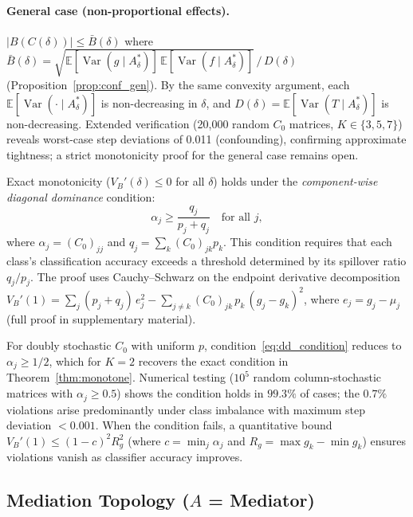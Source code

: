 \paragraph{General case (non-proportional effects).}
$|B(C(\delta))|\leq\bar{B}(\delta)$ where $\bar{B}(\delta)=\sqrt{\mathbb{E}[\operatorname{Var}(g\mid A^*_\delta)]\,\mathbb{E}[\operatorname{Var}(f\mid A^*_\delta)]}\,/\,D(\delta)$ (Proposition~\ref{prop:conf_gen}).
By the same convexity argument, each $\mathbb{E}[\operatorname{Var}(\cdot\mid A^*_\delta)]$ is non-decreasing in $\delta$, and $D(\delta)=\mathbb{E}[\operatorname{Var}(T\mid A^*_\delta)]$ is non-decreasing.
Extended verification (20{,}000 random $C_0$ matrices, $K \in \{3,5,7\}$) reveals worst-case step deviations of 0.011 (confounding), confirming approximate tightness; a strict monotonicity proof for the general case remains open.

\begin{remark}
\label{rem:conditional_monotonicity}
Exact monotonicity ($V_B'(\delta) \leq 0$ for all $\delta$) holds under the \emph{component-wise diagonal dominance} condition:
\begin{equation}
  \alpha_j \geq \frac{q_j}{p_j + q_j} \quad \text{for all } j,
  \label{eq:dd_condition}
\end{equation}
where $\alpha_j = (C_0)_{jj}$ and $q_j = \sum_k (C_0)_{jk} p_k$. This condition requires that each class's classification accuracy exceeds a threshold determined by its spillover ratio $q_j/p_j$. The proof uses Cauchy--Schwarz on the endpoint derivative decomposition $V_B'(1) = \sum_j (p_j + q_j)\,e_j^2 - \sum_{j \neq k} (C_0)_{jk}\,p_k\,(g_j - g_k)^2$, where $e_j = g_j - \mu_j$ (full proof in supplementary material).

For doubly stochastic $C_0$ with uniform $p$, condition~\eqref{eq:dd_condition} reduces to $\alpha_j \geq 1/2$, which for $K{=}2$ recovers the exact condition in Theorem~\ref{thm:monotone}. Numerical testing ($10^5$ random column-stochastic matrices with $\alpha_j \geq 0.5$) shows the condition holds in $99.3\%$ of cases; the $0.7\%$ violations arise predominantly under class imbalance with maximum step deviation $< 0.001$. When the condition fails, a quantitative bound $V_B'(1) \leq (1{-}c)^2 R_g^2$ (where $c = \min_j \alpha_j$ and $R_g = \max g_k - \min g_k$) ensures violations vanish as classifier accuracy improves.
\end{remark}

\subsection{Mediation Topology ($A$ = Mediator)}
\label{app:mediation}


